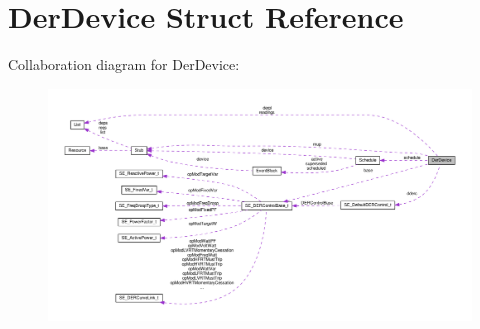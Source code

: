 \hypertarget{structDerDevice}{}\section{Der\+Device Struct Reference}
\label{structDerDevice}


Collaboration diagram for Der\+Device\+:\nopagebreak
\begin{figure}[H]
\begin{center}
\leavevmode
\includegraphics[width=350pt]{structDerDevice__coll__graph}
\end{center}
\end{figure}
